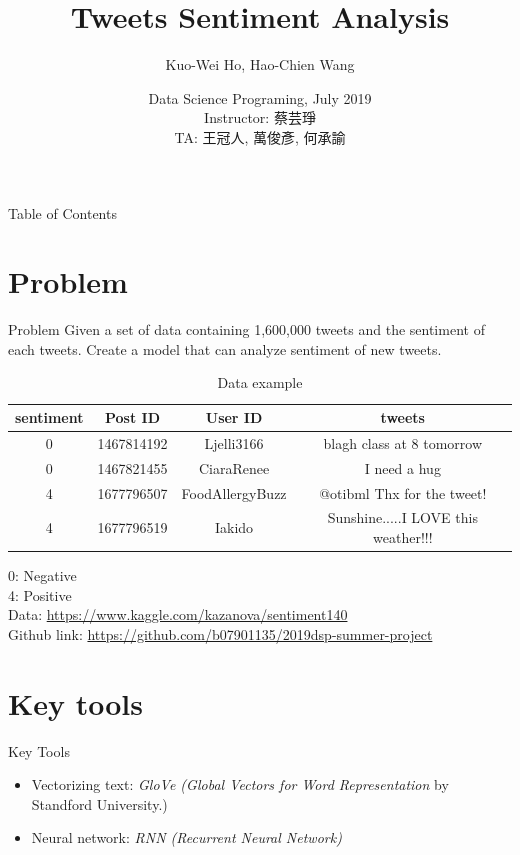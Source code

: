\documentclass{beamer}
\title{Tweets Sentiment Analysis}
\author{Kuo-Wei Ho\inst{1}, Hao-Chien Wang\inst{2}}
\institute[NTU]
{
	\inst{1}
	NTUEE
	\and
	\inst{2}
	NTUPhys
}
\date[DSP 2019]
{Data Science Programing, July 2019\\{\scriptsize Instructor: 蔡芸琤}\\{\scriptsize TA: 王冠人, 萬俊彥, 何承諭}}
\begin{document}
\frame{\titlepage}

\begin{frame}{Table of Contents}
	\tableofcontents
\end{frame}


\section{Problem}%
\label{sec:problem}

\begin{frame}{Problem}
	Given a set of data containing 1,600,000 tweets and the sentiment of each tweets. Create a model that can analyze sentiment of new tweets.\\
	\begin{table}[htpb]
		\tiny
		\centering
		\caption{Data example}
		\label{tab:data}
		\begin{tabular}{c c c c}
			sentiment & Post ID & User ID & tweets \\
			\hline
			 0 & 1467814192 & Ljelli3166 & blagh class at 8 tomorrow  \\
			 0 & 1467821455 & CiaraRenee & I need a hug  \\
			 4 & 1677796507 & FoodAllergyBuzz & @otibml Thx for the tweet!  \\
			 4 & 1677796519 & Iakido & Sunshine.....I LOVE this weather!!!  \\
		\end{tabular}
	\end{table}
	0: Negative \\
	4: Positive \\
	{\scriptsize Data: \url{https://www.kaggle.com/kazanova/sentiment140}} \\
	{\scriptsize Github link: \url{https://github.com/b07901135/2019dsp-summer-project}}
\end{frame}


\section{Key tools}%
\label{sec:key_tools}



\begin{frame}{Key Tools}
	\begin{itemize}
		\item Vectorizing text: \textit{GloVe (Global Vectors for Word Representation} by Standford University.)
		\item Neural network: \textit{RNN (Recurrent Neural Network)}
	\end{itemize}
\end{frame}
\end{document}
